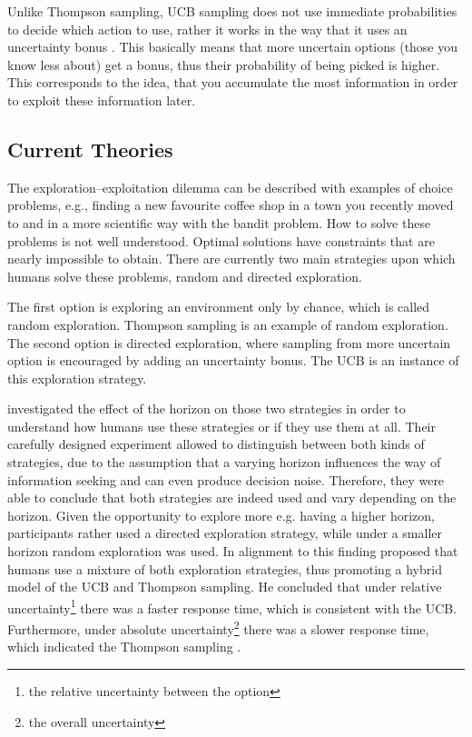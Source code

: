 Unlike Thompson sampling, UCB sampling \citep{auer2002finite} does not use immediate probabilities to decide which action to use, rather it works in the way that it uses an uncertainty bonus \citep{srinivas2009gaussian}. This basically means that more uncertain options (those you know less about) get a bonus, thus their probability of being picked is higher. This corresponds to the idea, that you accumulate the most information in order to exploit these information later.

\subsection{Current Theories}
The exploration--exploitation dilemma can be described with examples of choice problems, e.g., finding a new favourite coffee shop in a town you recently moved to and in a more scientific way with the bandit problem. %
How to solve these problems is not well understood. Optimal solutions have constraints that are nearly impossible to obtain. There are currently two main strategies upon which humans solve these problems, random and directed exploration.  

The first option is exploring an environment only by chance, which is called random exploration. Thompson sampling is an example of random exploration.
The second option is directed exploration, where sampling from more uncertain option is encouraged by adding an uncertainty bonus. The UCB is an instance of this exploration strategy.

\cite{wilson2014humans} investigated the effect of the horizon on those two strategies in order to understand how humans use these strategies or if they use them at all. Their carefully designed experiment allowed to distinguish between both kinds of strategies, due to the assumption that a varying horizon influences the way of information seeking and can even produce decision noise. Therefore, they were able to conclude that both strategies are indeed used and vary depending on the horizon. Given the opportunity to explore more e.g. having a higher horizon, participants rather used a directed exploration strategy, while under a smaller horizon random exploration was used.
In alignment to this finding \cite{gershman2018deconstructing} proposed that humans use a mixture of both exploration strategies, thus promoting a hybrid model of the UCB and Thompson sampling. He concluded that under relative uncertainty\footnote{the relative uncertainty between the option} there was a faster response time, which is consistent with the UCB. Furthermore, under absolute uncertainty\footnote{the overall uncertainty} there was a slower response time, which indicated the Thompson sampling \cite{gershman2018uncertainty}.

